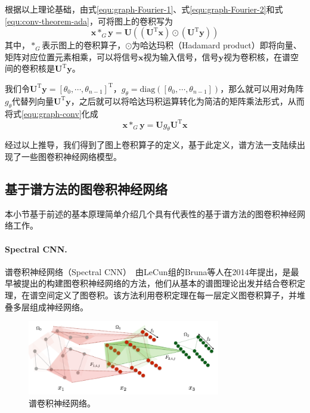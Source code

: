 \documentclass[final]{cvpr}
\newcommand{\mypara}[1]{\paragraph{#1.}}
\begin{document}
根据以上理论基础，由式\ref{equ:graph-Fourier-1}、式\ref{equ:graph-Fourier-2}和式\ref{equ:conv-theorem-ada}，可将图上的卷积写为
\begin{equation}\label{equ:graph-conv}
    \boldsymbol{x}*_{G}\boldsymbol{y}=\boldsymbol{U}
    \left(
        \left(
            \boldsymbol{U}^{\mathrm{T}}\boldsymbol{x}
        \right)
        \odot 
        \left(
            \boldsymbol{U}^{\mathrm{T}}\boldsymbol{y}
        \right)          
    \right)
\end{equation}
其中，$*_G$表示图上的卷积算子，$\odot $为哈达玛积（Hadamard product）即将向量、矩阵对应位置元素相乘，可以将信号$\boldsymbol{x}$视为输入信号，信号$\boldsymbol{y}$视为卷积核，在谱空间的卷积核是$\boldsymbol{U}^{\mathrm{T}}\boldsymbol{y}$。

我们令$\boldsymbol{U}^{\mathrm{T}}\boldsymbol{y}=\left[ \theta_0,\cdots,\theta_{n-1} \right]^{\mathrm{T}} $，$g_{\theta}=\mathrm{diag} \left( \left[ \theta_0,\cdots,\theta_{n-1} \right]  \right)
$，那么就可以用对角阵$g_{\theta}$代替列向量$\boldsymbol{U}^{\mathrm{T}}\boldsymbol{y}$，之后就可以将哈达玛积运算转化为简洁的矩阵乘法形式，从而将式\ref{equ:graph-conv}化成
\begin{equation}\label{equ:graph-conv-ada}
    \boldsymbol{x}*_{G}\boldsymbol{y}=\boldsymbol{U}
    g_{\theta}
    \boldsymbol{U}^{\mathrm{T}}\boldsymbol{x}      
\end{equation}

经过以上推导，我们得到了图上卷积算子的定义，基于此定义，谱方法一支陆续出现了一些图卷积神经网络模型。


\subsection{基于谱方法的图卷积神经网络}
本小节基于前述的基本原理简单介绍几个具有代表性的基于谱方法的图卷积神经网络工作。
\mypara{Spectral CNN}
谱卷积神经网络（Spectral CNN）~\cite{bruna2014spectral}由LeCun组的Bruna等人在2014年提出，是最早被提出的构建图卷积神经网络的方法，他们从基本的谱图理论出发并结合卷积定理，在谱空间定义了图卷积。该方法利用卷积定理在每一层定义图卷积算子，并堆叠多层组成神经网络。

\begin{figure}[htb!]
    \centering
    \includegraphics[width=0.75\textwidth]{Spectral CNN.png}
    \caption{谱卷积神经网络。}
    \label{fig:Spectral CNN}
\end{figure}
\end{document}
